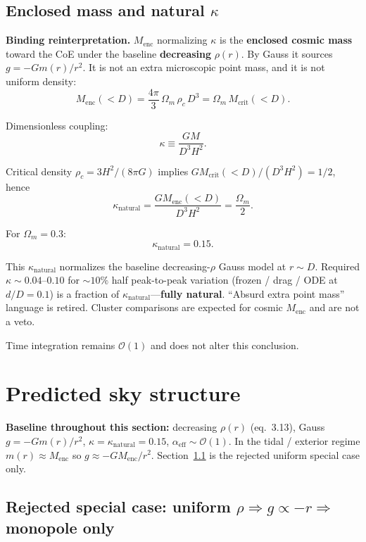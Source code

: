\documentclass[11pt,a4paper]{article}
\begin{document}
\subsection{Enclosed mass and natural \(\kappa\)}

\textbf{Binding reinterpretation.} \(M_{\mathrm{enc}}\) normalizing \(\kappa\) is the \textbf{enclosed cosmic mass} toward the CoE under the baseline \textbf{decreasing} \(\rho(r)\). By Gauss it sources \(g=-G m(r)/r^2\). It is not an extra microscopic point mass, and it is not uniform density:
\[
M_{\mathrm{enc}}(<D)=\frac{4\pi}{3}\,\Omega_m\,\rho_c\,D^3=\Omega_m\,M_{\mathrm{crit}}(<D).
\]

Dimensionless coupling:
\[
\kappa\equiv\frac{GM}{D^3 H^2}.
\]

Critical density \(\rho_c=3H^2/(8\pi G)\) implies \(G M_{\mathrm{crit}}(<D)/(D^3 H^2)=1/2\), hence
\begin{equation}
\boxed{\kappa_{\mathrm{natural}}=\frac{G M_{\mathrm{enc}}(<D)}{D^3 H^2}=\frac{\Omega_m}{2}}.
\end{equation}

For \(\Omega_m=0.3\):
\[
\kappa_{\mathrm{natural}}=0.15.
\]

This \(\kappa_{\mathrm{natural}}\) normalizes the baseline decreasing-\(\rho\) Gauss model at \(r\sim D\). Required \(\kappa\sim 0.04\)--\(0.10\) for \(\sim 10\%\) half peak-to-peak variation (frozen / drag / ODE at \(d/D=0.1\)) is a fraction of \(\kappa_{\mathrm{natural}}\)---\textbf{fully natural}. ``Absurd extra point mass'' language is retired. Cluster comparisons are expected for cosmic \(M_{\mathrm{enc}}\) and are not a veto.

Time integration remains \(\mathcal{O}(1)\) and does not alter this conclusion.

\section{Predicted sky structure}

\textbf{Baseline throughout this section:} decreasing \(\rho(r)\) (eq.~3.13), Gauss \(g=-G m(r)/r^2\), \(\kappa=\kappa_{\mathrm{natural}}=0.15\), \(\alpha_{\mathrm{eff}}\sim\mathcal{O}(1)\). In the tidal / exterior regime \(m(r)\approx M_{\mathrm{enc}}\) so \(g\approx -GM_{\mathrm{enc}}/r^2\). Section~\ref{sec:uniform} is the rejected uniform special case only.

\subsection{Rejected special case: uniform \(\rho\Rightarrow g\propto -r\Rightarrow\) monopole only}
\label{sec:uniform}
\end{document}
